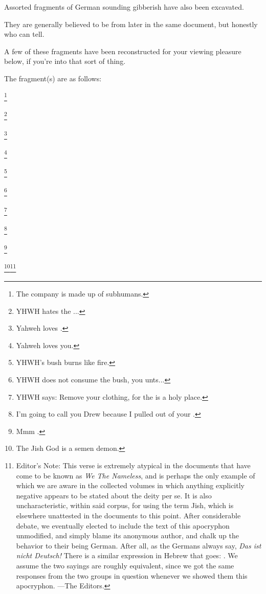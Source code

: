 {{Assorted fragments of German sounding gibberish have also been excavated.

They are generally believed to be from later in the same document, but honestly who can tell.

A few of these fragments have been reconstructed for your viewing pleasure below, if you're into that sort of thing.

The fragment(s) are as follows:

\footnote{The company is made up of subhumans.}

\footnote{YHWH hates the ...}

\footnote{Yahweh loves .}

\footnote{Yahweh loves you.}

\footnote{YHWH's bush burns like fire.}

\footnote{YHWH does not consume the bush, you unts...}

\footnote{YHWH says: Remove your clothing, for the  is a holy place.}

\footnote{I'm going to call you Drew because I pulled out of your .}

\footnote{Mmm\mdash{} .}

\footnote{The Jish God is a semen demon.}\footnote{Editor's Note: This verse is extremely atypical in the documents that have come to be known as \textit{We The Nameless}, and is perhaps the only example of which we are aware in the collected volumes in which anything explicitly negative appears to be stated about the deity per se. It is also uncharacteristic, within said corpus, for using the term Jish, which is elsewhere unattested in the documents to this point. After considerable debate, we eventually elected to include the text of this apocryphon unmodified, and simply blame its anonymous author, and chalk up the behavior to their being German. After all, as the Germans always say, \textit{Das ist nicht Deutsch!} There is a similar expression in Hebrew that goes: . We assume the two sayings are roughly equivalent, since we got the same responses from the two groups in question whenever we showed them this apocryphon. ---The Editors.}

}}

